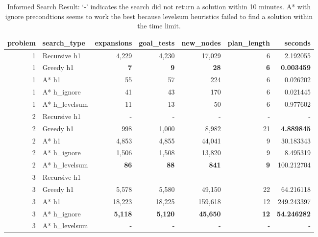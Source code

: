 \documentclass[letterpaper]{article}
\begin{document}
\begin{table}[!ht]
\begin{tabular}{rlrrrrr}
\toprule
 problem &    search\_type & expansions & goal\_tests & new\_nodes & plan\_length &     seconds \\
\midrule
       1 &   Recursive h1 &      4,229 &      4,230 &    17,029 &           6 &    2.192055 \\
       1 &      Greedy h1 &          \textbf{7} &          \textbf{9} &        \textbf{28} &           \textbf{6} &    \textbf{0.003459} \\
       1 &          A* h1 &         55 &         57 &       224 &           6 &    0.026202 \\
       1 &    A* h\_ignore &         41 &         43 &       170 &           6 &    0.021445 \\
       1 &  A* h\_levelsum &         11 &         13 &        50 &           6 &    0.977602 \\
\midrule
       2 &   Recursive h1 &        - &        - &       - &         - &         - \\
       2 &      Greedy h1 &        998 &      1,000 &     8,982 &          21 &    \textbf{4.889845} \\
       2 &          A* h1 &      4,853 &      4,855 &    44,041 &           9 &   30.183343 \\
       2 &    A* h\_ignore &      1,506 &      1,508 &    13,820 &           9 &    8.495319 \\
       2 &  A* h\_levelsum &         \textbf{86} &         \textbf{88} &       \textbf{841} &           \textbf{9} &  100.212704 \\
\midrule
       3 &   Recursive h1 &        - &        - &       - &         - &         - \\
       3 &      Greedy h1 &      5,578 &      5,580 &    49,150 &          22 &   64.216118 \\
       3 &          A* h1 &     18,223 &     18,225 &   159,618 &          12 &  249.243397 \\
       3 &    A* h\_ignore &      \textbf{5,118} &      \textbf{5,120} &    \textbf{45,650} &          \textbf{12} &   \textbf{54.246282} \\
       3 &  A* h\_levelsum &        - &        - &       - &         - &         - \\
\bottomrule
\end{tabular}
\caption{Informed Search Result: `-' indicates the search did not return a solution within 10 minutes. A* with ignore precondtions seems to work the best because levelsum heuristics failed to find a solution within the time limit.}
\label{table:informed}
\end{table}
\end{document}
